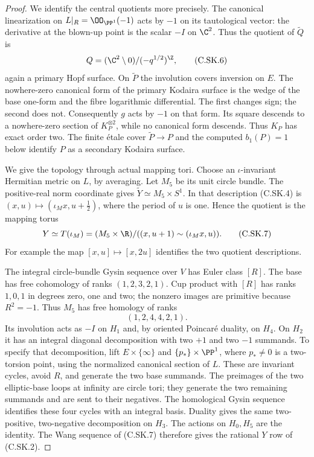\begin{proof}
We identify the central quotients more precisely.
The canonical linearization on
$L|_R=\OO_{\PP^1}(-1)$ acts by $-1$ on its
tautological vector: the derivative at the
blown-up point is the scalar $-I$ on $\C^2$.
Thus the quotient of $\widetilde Q$ is
\[
                 Q=(\C^2\setminus0)/
                         (-q^{1/2})^{\Z},              \tag{C.SK.6}
\]
again a primary Hopf surface. On $\widetilde P$
the involution covers inversion on $E$.
The nowhere-zero canonical form of the primary
Kodaira surface is the wedge of the base
one-form and the fibre logarithmic differential.
The first changes sign; the second does not.
Consequently $g$ acts by $-1$ on that form.
Its square descends to a nowhere-zero section
of $K_P^{\otimes2}$, while no canonical form
descends. Thus $K_P$ has exact order two.
The finite \'etale cover $\widetilde P\to P$
and the computed $b_1(P)=1$ below identify $P$
as a secondary Kodaira surface.

We give the topology through actual mapping
tori. Choose an $\iota$-invariant Hermitian
metric on $L$, by averaging. Let $M_5$ be its
unit circle bundle. The positive-real norm
coordinate gives
$\widetilde Y\simeq M_5\times S^1$. In that
description (C.SK.4) is
$(x,u)\mapsto(\iota_Mx,u+\tfrac12)$, where
the period of $u$ is one. Hence the quotient
is the mapping torus
\[
          Y\simeq T(\iota_M)
            =(M_5\times\R)/
               ((x,u+1)\sim(\iota_Mx,u)).               \tag{C.SK.7}
\]
For example the map $[x,u]\mapsto[x,2u]$
identifies the two quotient descriptions.

The integral circle-bundle Gysin sequence
over $V$ has Euler class $[R]$. The base has
free cohomology of ranks $(1,2,3,2,1)$.
Cup product with $[R]$ has ranks $1,0,1$
in degrees zero, one and two; the nonzero
images are primitive because $R^2=-1$.
Thus $M_5$ has free homology of ranks
\[
                         (1,2,4,4,2,1).                \tag{C.SK.8}
\]
Its involution acts as $-I$ on $H_1$ and,
by oriented Poincar\'e duality, on $H_4$.
On $H_2$ it has an integral diagonal
decomposition with two $+1$ and two $-1$
summands. To specify that decomposition,
lift $E\times\{\infty\}$ and
$\{p_*\}\times\PP^1$, where $p_*\ne0$ is
a two-torsion point, using the normalized
canonical section of $L$. These are
invariant cycles, avoid $R$, and generate
the two base summands. The preimages of
the two elliptic-base loops at infinity
are circle tori; they generate the two
remaining summands and are sent to their
negatives. The homological Gysin sequence
identifies these four cycles with an
integral basis. Duality gives the same
two-positive, two-negative decomposition
on $H_3$. The actions on $H_0,H_5$ are
the identity. The Wang sequence of
(C.SK.7) therefore gives the rational
$Y$ row of (C.SK.2).


\end{proof}
